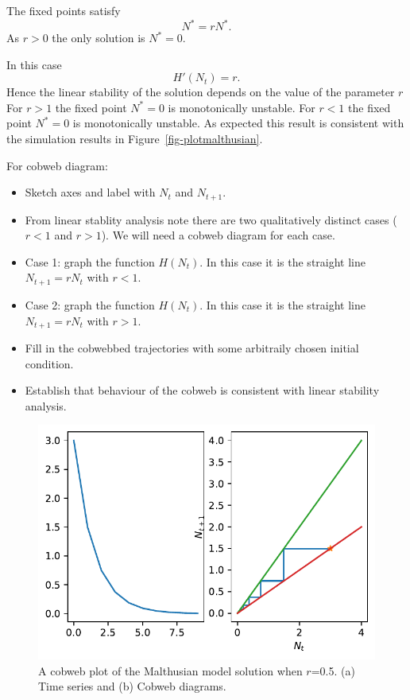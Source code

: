 \documentclass[
  letterpaper,
  DIV=11,
  numbers=noendperiod]{scrreprt}
\providecommand{\tightlist}{%
  \setlength{\itemsep}{0pt}\setlength{\parskip}{0pt}}\usepackage{longtable,booktabs,array}
\begin{document}
The fixed points satisfy \[
N^*=rN^*.
\] As \(r>0\) the only solution is \(N^*=0\).

In this case \[
H'(N_t)=r.
\] Hence the linear stability of the solution depends on the value of
the parameter \(r\) For \(r>1\) the fixed point \(N^*=0\) is
monotonically unstable. For \(r<1\) the fixed point \(N^*=0\) is
monotonically unstable. As expected this result is consistent with the
simulation results in Figure~\ref{fig-plotmalthusian}.

For cobweb diagram:

\begin{itemize}
\tightlist
\item
  Sketch axes and label with \(N_t\) and \(N_{t+1}\).
\item
  From linear stablity analysis note there are two qualitatively
  distinct cases (\(r<1\) and \(r>1\)). We will need a cobweb diagram
  for each case.
\item
  Case 1: graph the function \(H(N_t)\). In this case it is the straight
  line \(N_{t+1}=rN_t\) with \(r<1\).
\item
  Case 2: graph the function \(H(N_t)\). In this case it is the straight
  line \(N_{t+1}=rN_t\) with \(r>1\).
\item
  Fill in the cobwebbed trajectories with some arbitraily chosen initial
  condition.
\item
  Establish that behaviour of the cobweb is consistent with linear
  stability analysis.
\end{itemize}

\begin{figure}

{\centering \includegraphics{MA32009-SinglePopDiscreteTimea_files/figure-pdf/fig-plotmalthusiancobweb-output-1.pdf}

}

\caption{\label{fig-plotmalthusiancobweb}A cobweb plot of the Malthusian
model solution when \(r\)=0.5. (a) Time series and (b) Cobweb diagrams.}

\end{figure}
\end{document}
